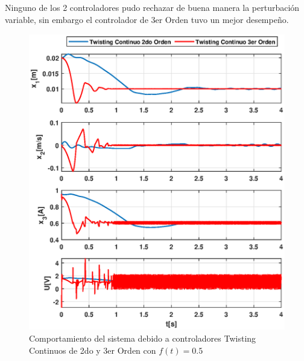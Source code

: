 \documentclass[onecolumn,10pt]{article}
\begin{document}
\\
\\
\\
\\
\\
\\
\\
\\
\\
\\
\\
\\
\\
\\
Ninguno de los 2 controladores pudo rechazar de buena manera la perturbaci\'on variable, sin embargo el controlador de 3er Orden tuvo un mejor desempe\~no.
\begin{figure}[!h]
\centering
\includegraphics[scale=0.55]{xu_3o_tc23o_pc.eps}
\caption{Comportamiento del sistema debido a controladores Twisting Continuos de 2do y 3er Orden con $f(t)=0.5$}
\end{figure}
\end{document}
